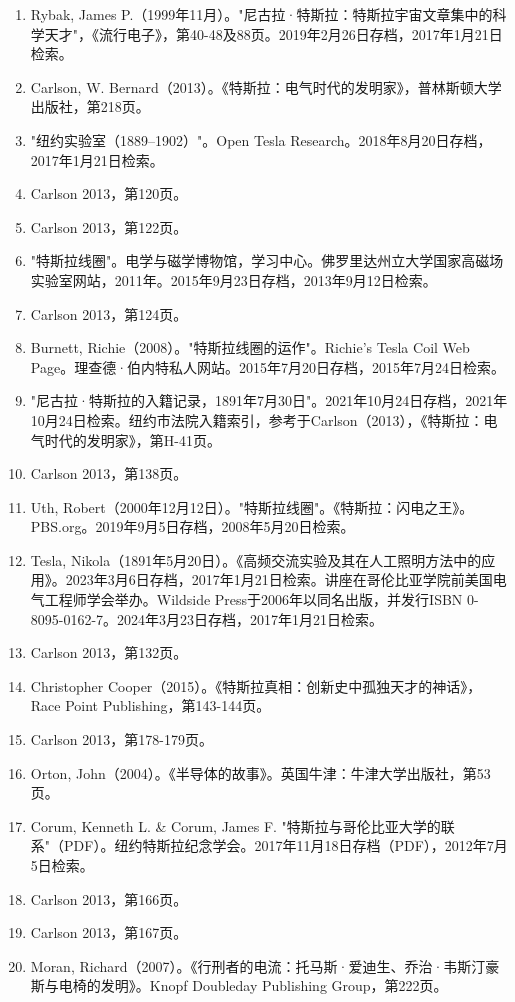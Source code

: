 \begin{enumerate}
\item Rybak, James P.（1999年11月）。"尼古拉·特斯拉：特斯拉宇宙文章集中的科学天才"，《流行电子》，第40-48及88页。2019年2月26日存档，2017年1月21日检索。  
\item Carlson, W. Bernard（2013）。《特斯拉：电气时代的发明家》，普林斯顿大学出版社，第218页。  
\item "纽约实验室（1889–1902）"。Open Tesla Research。2018年8月20日存档，2017年1月21日检索。  
\item Carlson 2013，第120页。  
\item Carlson 2013，第122页。  
\item "特斯拉线圈"。电学与磁学博物馆，学习中心。佛罗里达州立大学国家高磁场实验室网站，2011年。2015年9月23日存档，2013年9月12日检索。
\item Carlson 2013，第124页。  
\item Burnett, Richie（2008）。"特斯拉线圈的运作"。Richie's Tesla Coil Web Page。理查德·伯内特私人网站。2015年7月20日存档，2015年7月24日检索。  
\item "尼古拉·特斯拉的入籍记录，1891年7月30日"。2021年10月24日存档，2021年10月24日检索。纽约市法院入籍索引，参考于Carlson（2013），《特斯拉：电气时代的发明家》，第H-41页。  
\item Carlson 2013，第138页。  
\item Uth, Robert（2000年12月12日）。"特斯拉线圈"。《特斯拉：闪电之王》。PBS.org。2019年9月5日存档，2008年5月20日检索。  
\item Tesla, Nikola（1891年5月20日）。《高频交流实验及其在人工照明方法中的应用》。2023年3月6日存档，2017年1月21日检索。讲座在哥伦比亚学院前美国电气工程师学会举办。Wildside Press于2006年以同名出版，并发行ISBN 0-8095-0162-7。2024年3月23日存档，2017年1月21日检索。  
\item Carlson 2013，第132页。  
\item Christopher Cooper（2015）。《特斯拉真相：创新史中孤独天才的神话》，Race Point Publishing，第143-144页。  
\item Carlson 2013，第178-179页。  
\item Orton, John（2004）。《半导体的故事》。英国牛津：牛津大学出版社，第53页。
\item Corum, Kenneth L. & Corum, James F. "特斯拉与哥伦比亚大学的联系"（PDF）。纽约特斯拉纪念学会。2017年11月18日存档（PDF），2012年7月5日检索。  
\item Carlson 2013，第166页。  
\item Carlson 2013，第167页。  
\item Moran, Richard（2007）。《行刑者的电流：托马斯·爱迪生、乔治·韦斯汀豪斯与电椅的发明》。Knopf Doubleday Publishing Group，第222页。  

\end{enumerate}
